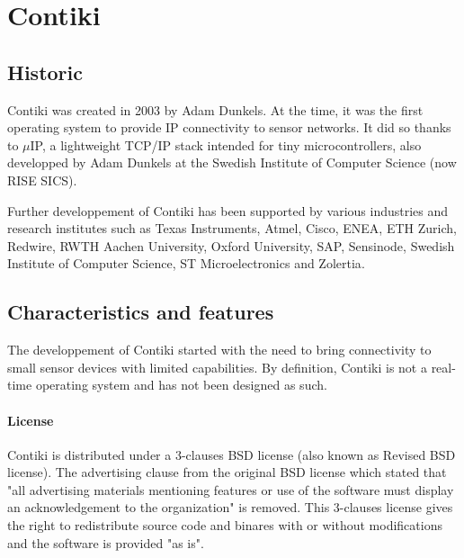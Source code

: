 \section{Contiki}

\subsection{Historic}
Contiki\cite{contiki} was created in 2003 by Adam Dunkels\cite{AdamDunkels}. %
At the time, it was the first operating system to provide IP connectivity to sensor networks.
It did so thanks to $\mu$IP\cite{uip}, a lightweight TCP/IP stack intended for tiny microcontrollers,
    also developped by Adam Dunkels at the Swedish Institute of Computer Science (now RISE SICS).%

Further developpement of Contiki has been supported by various industries and research institutes 
    such as Texas Instruments, Atmel, Cisco, ENEA, ETH Zurich, Redwire, RWTH Aachen University, 
    Oxford University, SAP, Sensinode, Swedish Institute of Computer Science, ST Microelectronics and Zolertia\cite{Contiki2}.

\subsection{Characteristics and features}
The developpement of Contiki started with the need to bring connectivity to small sensor devices with limited capabilities.
By definition, Contiki is not a real-time operating system and has not been designed as such.

\paragraph{License} Contiki is distributed under a 3-clauses BSD license (also known as Revised BSD license).
The advertising clause from the original BSD license which stated that "all advertising materials mentioning features or use of the software
must display an acknowledgement to the organization" is removed.
This 3-clauses license gives the right to redistribute source code and binares with or without modifications
    and the software is provided "as is".

